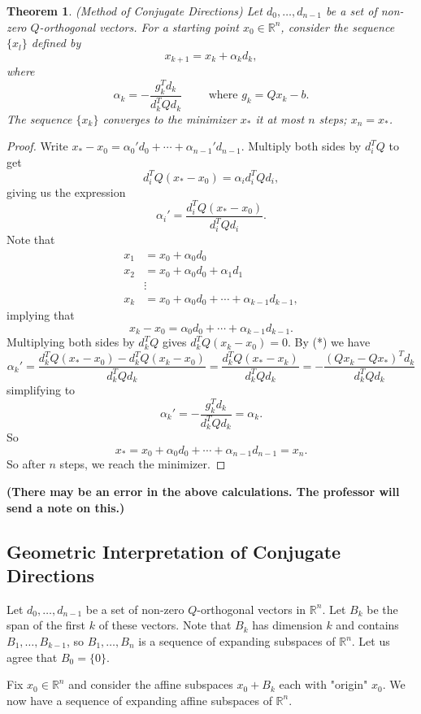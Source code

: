 \documentclass[11pt]{book}
\newcommand{\R}{\mathbb{R}}
\newtheorem{theorem}{Theorem}[subsection]
\begin{document}
\begin{theorem}
(Method of Conjugate Directions)
Let $d_0, \dots, d_{n-1}$ be a set of non-zero $Q$-orthogonal vectors. For a starting point $x_0 \in \R^n$, consider the sequence $\{x_l\}$ defined by 
\[
x_{k+1} = x_k + \alpha_k d_k,
\]
where
\[
\alpha_k = -\frac{g_k^Td_k}{d_k^TQd_k} \qquad \text{ where } g_k = Qx_k - b.
\]
The sequence $\{x_k\}$ converges to the minimizer $x_*$ it at most $n$ steps; $x_n = x_*$.
\end{theorem}
\begin{proof}
Write $x_* - x_0 = \alpha_0' d_0 + \cdots + \alpha_{n-1}'d_{n-1}$. Multiply both sides by $d_i^TQ$ to get
\[
d_i^TQ(x_* - x_0) = \alpha_i d_i^TQd_i,
\]
giving us the expression
\[
\tag{*}
\alpha_i' = \frac{d_i^TQ(x_*-x_0)}{d_i^TQd_i}.
\]
Note that
\begin{align*}
x_1 &= x_0 + \alpha_0 d_0 \\
x_2 &= x_0 + \alpha_0 d_0 + \alpha_1 d_1 \\
&\vdots \\
x_k &= x_0 + \alpha_0 d_0 + \cdots + \alpha_{k-1}d_{k-1},
\end{align*}
implying that
\[
x_k - x_0 = \alpha_0 d_0 + \cdots + \alpha_{k-1}d_{k-1}.
\]
Multiplying both sides by $d_k^TQ$ gives $d_k^TQ(x_k-x_0) = 0$. By (*) we have
\[
\alpha_k' = \frac{d_k^T Q(x_* - x_0) - d_k^TQ(x_k - x_0)}{d_k^TQd_k} = \frac{d_k^TQ(x_* - x_k)}{d_k^TQd_k} = -\frac{(Qx_k - Qx_*)^T d_k}{d_k^TQd_k}
\]
simplifying to
\[
\alpha_k' = -\frac{g_k^T d_k}{d_k^TQd_k} = \alpha_k.
\]
So
\[
x_* = x_0 + \alpha_0 d_0 + \cdots + \alpha_{n-1}d_{n-1} = x_n.
\]
So after $n$ steps, we reach the minimizer.
\end{proof}
\textbf{(There may be an error in the above calculations. The professor will send a note on this.)}

\subsection{Geometric Interpretation of Conjugate Directions}

Let $d_0, \dots, d_{n-1}$ be a set of non-zero $Q$-orthogonal vectors in $\R^n$. Let $B_k$ be the span of the first $k$ of these vectors. Note that $B_k$ has dimension $k$ and contains $B_1, \dots, B_{k-1}$, so $B_1, \dots, B_n$ is a sequence of expanding subspaces of $\R^n$. Let us agree that $B_0 = \{0\}$.

Fix $x_0 \in \R^n$ and consider the affine subspaces $x_0 + B_k$ each with "origin" $x_0$. We now have a sequence of expanding affine subspaces of $\R^n$.
\end{document}
